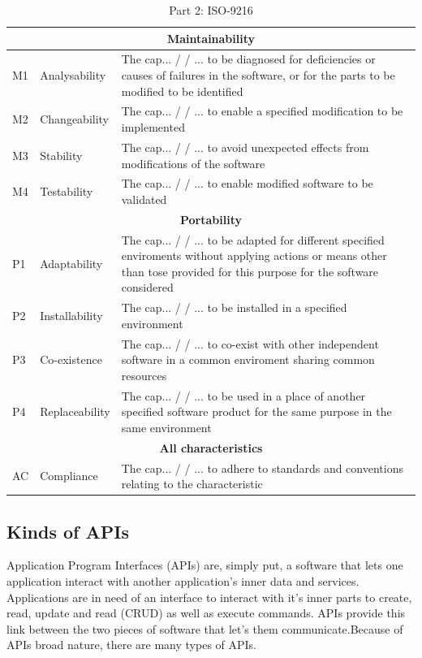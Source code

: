 \documentclass{article}
\begin{document}
\begin{table}[H]
\centering
\begin{tabularx}{\columnwidth}{|l|l|X|}
\hline
\multicolumn{3}{c}{\textbf{Maintainability}} \\ \hline
M1&Analysability & The cap... / / ... to be diagnosed for deficiencies or causes of failures in the
software, or for the parts to be modified to be identified \\ \hline
M2&Changeability & The cap... / / ... to enable a specified modification to be implemented \\ \hline
M3&Stability & The cap... / / ... to avoid unexpected effects from modifications of the software \\ \hline
M4&Testability &The cap... / / ... to enable modified software to be validated \\ \hline

\multicolumn{3}{c}{\textbf{Portability}} \\ \hline
P1& Adaptability &The cap... / / ... to be adapted for different specified enviroments without applying
actions or means other than tose provided for this purpose for the software considered \\ \hline
P2&Installability& The cap... / / ... to be installed in a specified environment \\ \hline
P3&Co-existence &The cap... / / ... to co-exist with other independent software in a common enviroment sharing
common resources \\ \hline
P4&Replaceability &The cap... / / ... to be used in a place of another specified software product for the same
purpose in the same environment \\ \hline

\multicolumn{3}{c}{\textbf{All characteristics}} \\ \hline
AC&Compliance & The cap... / / ... to adhere to standards and conventions relating to the
characteristic \\ \hline
\end{tabularx}
\caption{Part 2: ISO-9216}
\label{tabl:standard2}
\end{table}
\subsection{Kinds of APIs}

Application Program Interfaces (APIs) are, simply put, a software that
lets one application interact with another application's inner data and
services. Applications are in need of an interface to interact with it's
inner parts to create, read, update and read (CRUD) as well as execute
commands. APIs provide this link between the two pieces of software that let's
them communicate.Because of APIs broad nature, there are many types of
APIs.
\end{document}
